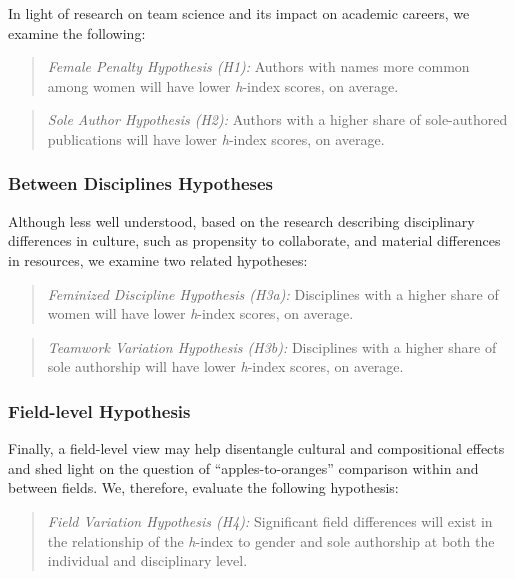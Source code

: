 \documentclass[
  10pt,
  letterpaper,
]{article}
\begin{document}
In light of research on team science and its impact on academic careers,
we examine the following:

\begin{quote}
\emph{Female Penalty Hypothesis (H1):} Authors with names more common
among women will have lower \emph{h}-index scores, on average.
\end{quote}

\begin{quote}
\emph{Sole Author Hypothesis (H2):} Authors with a higher share of
sole-authored publications will have lower \emph{h}-index scores, on
average.
\end{quote}

\subsubsection{Between Disciplines
Hypotheses}\label{between-disciplines-hypotheses}

Although less well understood, based on the research describing
disciplinary differences in culture, such as propensity to collaborate,
and material differences in resources, we examine two related
hypotheses:

\begin{quote}
\emph{Feminized Discipline Hypothesis (H3a):} Disciplines with a higher
share of women will have lower \emph{h}-index scores, on average.
\end{quote}

\begin{quote}
\emph{Teamwork Variation Hypothesis (H3b):} Disciplines with a higher
share of sole authorship will have lower \emph{h}-index scores, on
average.
\end{quote}

\subsubsection{Field-level Hypothesis}\label{field-level-hypothesis}

Finally, a field-level view may help disentangle cultural and
compositional effects and shed light on the question of
``apples-to-oranges'' comparison within and between fields. We,
therefore, evaluate the following hypothesis:

\begin{quote}
\emph{Field Variation Hypothesis (H4):} Significant field differences
will exist in the relationship of the \emph{h}-index to gender and sole
authorship at both the individual and disciplinary level.
\end{quote}
\end{document}
